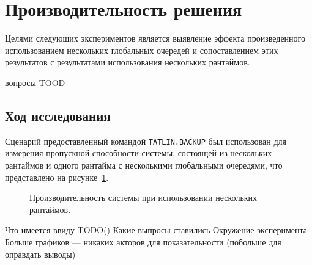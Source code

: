 \section{Производительность решения}

Целями следующих экспериментов является выявление эффекта произведенного использованием нескольких глобальных очередей и сопоставлением этих результатов с результатами использования нескольких рантаймов.

вопросы TOOD

\subsection{Ход исследования}

Сценарий предоставленный командой \verb|TATLIN.BACKUP| был использован для измерения пропускной способности системы, состоящей из нескольких рантаймов и одного рантайма с несколькими глобальными очередями, что представлено на рисунке~\ref{fig:tatlin:multi_rt_gp:eval}.

\begin{figure}[H]
    \begin{center}
    \end{center}

    \caption{Производительность системы при использовании нескольких рантаймов.}
    \label{fig:tatlin:multi_rt_gp:eval}
\end{figure}

Что имеется ввиду TODO()
Какие выпросы ставились
Окружение эксперимента
Больше графиков --- никаких акторов для показательности (побольше для оправдать выводы)

